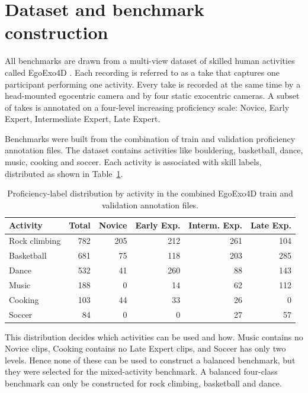 \documentclass[logo,msc]{infthesis}
\begin{document}
\section{Dataset and benchmark construction}

All benchmarks are drawn from a multi-view dataset of skilled human
activities called EgoExo4D \citep{grauman2024}. Each recording is referred
to as a take that captures one participant performing one activity. Every
take is recorded at the same time by a head-mounted egocentric camera and
by four static exocentric cameras. A subset of takes is annotated on a
four-level increasing proficiency scale: Novice, Early Expert, Intermediate
Expert, Late Expert.

Benchmarks were built from the combination of train and validation
proficiency annotation files. The dataset contains activities like
bouldering, basketball, dance, music, cooking and soccer. Each activity is
associated with skill labels, distributed as shown in
Table~\ref{tab:activity-dist}.

\begin{table}[H]
\centering
\caption{Proficiency-label distribution by activity in the combined
EgoExo4D train and validation annotation files.}
\label{tab:activity-dist}
\small
\begin{tabular}{@{}l r r r r r@{}}
\toprule
\textbf{Activity} & \textbf{Total} & \textbf{Novice} & \textbf{Early Exp.}
 & \textbf{Interm. Exp.} & \textbf{Late Exp.} \\
\midrule
Rock climbing & 782 & 205 & 212 & 261 & 104 \\
Basketball    & 681 &  75 & 118 & 203 & 285 \\
Dance         & 532 &  41 & 260 &  88 & 143 \\
Music         & 188 &   0 &  14 &  62 & 112 \\
Cooking       & 103 &  44 &  33 &  26 &   0 \\
Soccer        &  84 &   0 &   0 &  27 &  57 \\
\bottomrule
\end{tabular}
\end{table}

This distribution decides which activities can be used and how. Music
contains no Novice clips, Cooking contains no Late Expert clips, and Soccer
has only two levels. Hence none of these can be used to construct a
balanced benchmark, but they were selected for the mixed-activity
benchmark. A balanced four-class benchmark can only be constructed for
rock climbing, basketball and dance.
\end{document}
